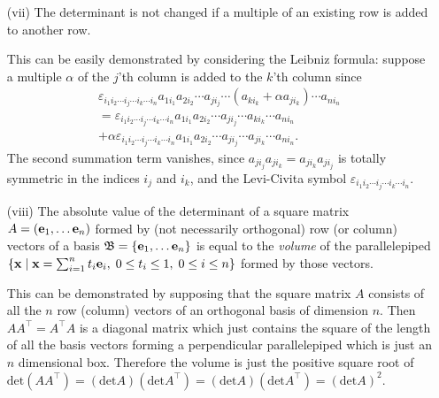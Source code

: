 \begin{itemize}
\item[(vii)]
The determinant is not changed if a multiple of an existing row is added to another row.

{\color{OliveGreen}
\bproof
This can be easily demonstrated by considering the Leibniz formula: suppose a multiple $\alpha$
of the $j$'th column is added to the $k$'th column since
\begin{equation}
\begin{split}
\varepsilon_{i_1 i_2\cdots i_j \cdots i_k \cdots i_n} a_{1i_1}a_{2i_2} \cdots a_{j i_j} \cdots (a_{k i_k} + \alpha a_{j i_k}) \cdots a_{ni_n}\\
=
\varepsilon_{i_1 i_2\cdots i_j \cdots i_k \cdots i_n} a_{1i_1}a_{2i_2} \cdots a_{j i_j} \cdots  a_{k i_k} \cdots a_{ni_n} \\
+\alpha \varepsilon_{i_1 i_2\cdots i_j \cdots i_k \cdots i_n} a_{1i_1}a_{2i_2} \cdots a_{j i_j} \cdots   a_{j i_k} \cdots a_{ni_n}.
\end{split}
\end{equation}
The second summation term vanishes, since
$
a_{j i_j} a_{j i_k}
=
a_{j i_k} a_{j i_j}
$
is totally symmetric in the indices $i_j$ and $i_k$,
and the Levi-Civita symbol $\varepsilon_{i_1 i_2\cdots i_j \cdots i_k \cdots i_n}$.
\eproof
}

\item[(viii)]
The absolute value of the determinant of a square matrix $A= \left({\bf e}_1, \ldots {\bf e}_n \right)$ formed by (not necessarily orthogonal)
row (or column) vectors of a basis
$\frak B= \{ {\bf e}_1, \ldots {\bf e}_n\}$
is equal to the {\em volume} of the parallelepiped
$
\left\{ {\bf x} \mid {\bf x} =\sum_{i=1}^n t_i {\bf e}_i, \; 0 \le t_i \le 1, \; 0\le i \le n \right\}
$
formed by those vectors.

{\color{OliveGreen}
\bproof
This can be demonstrated 
by supposing that
the square matrix $A$ consists of all the $n$ row (column) vectors of an orthogonal basis of dimension $n$.
Then
$AA^\intercal =A^\intercal A$ is a  diagonal matrix  which just contains the square of the
length of all the basis vectors forming a perpendicular parallelepiped which
is just an $n$ dimensional box.
Therefore the volume is just the positive square root of
$\textrm{det} ( AA^\intercal  ) =
(\textrm{det} A) (\textrm{det} A^\intercal  ) = (\textrm{det} A) (\textrm{det} A^\intercal  )=(\textrm{det} A)^2$.

}
\end{itemize}
